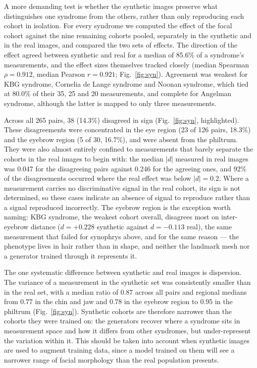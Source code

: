 \documentclass[11pt]{article}
\begin{document}
A more demanding test is whether the synthetic images preserve what
distinguishes one syndrome from the others, rather than only reproducing each
cohort in isolation. For every syndrome we computed the effect of the focal
cohort against the nine remaining cohorts pooled, separately in the synthetic
and in the real images, and compared the two sets of effects. The direction of
the effect agreed between synthetic and real for a median of 85.6\% of a
syndrome's measurements, and the effect sizes themselves tracked closely
(median Spearman $\rho = 0.912$, median Pearson $r = 0.921$;
Fig.~\ref{fig:syn}). Agreement was
weakest for KBG syndrome, Cornelia de Lange syndrome and Noonan syndrome, which
tied at 80.0\% of their 35, 25 and 20 measurements, and complete for Angelman
syndrome, although the latter is mapped to only three measurements.

Across all 265 pairs, 38 (14.3\%) disagreed in sign
(Fig.~\ref{fig:syn}, highlighted). These disagreements were
concentrated in the eye region (23 of 126 pairs, 18.3\%) and the eyebrow region
(5 of 30, 16.7\%), and were absent from the philtrum. They were
also almost entirely confined to measurements that barely separate the cohorts
in the real images to begin with: the median $|d|$ measured in real images was
0.047 for the disagreeing pairs against 0.246 for the agreeing ones, and 92\% of
the disagreements occurred where the real effect was below $|d| = 0.2$. Where a
measurement carries no discriminative signal in the real cohort, its sign is not
determined, so these cases indicate an absence of signal to reproduce rather
than a signal reproduced incorrectly. The eyebrow region is the exception worth
naming: KBG syndrome, the weakest cohort overall, disagrees most on inter-eyebrow
distance ($d = +0.228$ synthetic against $d = -0.113$ real), the same measurement
that failed for synophrys above, and for the same reason --- the phenotype lives
in hair rather than in shape, and neither the landmark mesh nor a generator
trained through it represents it.

The one systematic difference between synthetic and real images is dispersion.
The variance of a measurement in the synthetic set was consistently smaller than
in the real set, with a median ratio of 0.87 across all pairs and regional
medians from 0.77 in the chin and jaw and 0.78 in the eyebrow region to 0.95 in
the philtrum (Fig.~\ref{fig:syn}). Synthetic cohorts are therefore narrower than the cohorts they were
trained on: the generators recover where a syndrome sits in measurement space
and how it differs from other syndromes, but under-represent the variation
within it. This should be taken into account when synthetic images are used to
augment training data, since a model trained on them will see a narrower range
of facial morphology than the real population presents.
\end{document}

